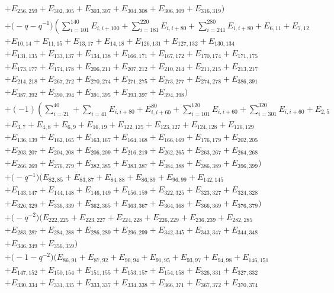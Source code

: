 \documentclass[pdftex]{sigma}
\numberwithin{equation}{section}
\theoremstyle{definition}
\begin{document}
\begin{align*}
&+E_{256,259}+E_{302,305}+E_{303,307}+E_{304,308}+E_{306,309}+E_{316,319})
\\
&+\bigl(-q - q^{-1}\bigr)\left(\sum_{i=101}^{140}E_{i,i+100}+\sum_{i=181}^{220}E_{i,i+80}+ \sum_{i=241}^{280}E_{i,i+80}+E_{6,11}+E_{7,12}\right.\\
&+E_{10,14}+E_{11,15}+E_{13,17}+E_{14,18}+E_{126,131}+E_{127,132}+E_{130,134}\\
&+E_{131,135}+E_{133,137}+E_{134,138}+E_{166,171}+E_{167,172}+E_{170,174}+E_{171,175}\\
&+E_{173,177}+E_{174,178}+E_{206,211}+E_{207,212}+E_{210,214}+E_{211,215}+E_{213,217}\\
&+E_{214,218}+E_{267,272}+E_{270,274}+E_{271,275}+E_{273,277}+E_{274,278}+E_{386,391}\\
&+E_{387,392}+E_{390,394}+E_{391,395}+E_{393,397}+E_{394,398})\\
&
+(-1)\left(\sum_{i=21}^{40} + \sum_{i=41} E_{i,i+80}+E_{i,i+60}^{80}+\sum_{i=101}^{120}E_{i,i+60}+\sum_{i=301}^{320}E_{i,i+60}+E_{2,5}\right. \\
&+E_{3,7}+E_{4,8}+E_{6,9}+E_{16,19}+E_{122,125}+E_{123,127}+E_{124,128}+E_{126,129}\\
&+E_{136,139}+E_{162,165}+E_{163,167}+E_{164,168}+E_{166,169}+E_{176,179}+E_{202,205}\\
&+E_{203,207}+E_{204,208}+E_{206,209}+E_{216,219}+E_{262,265}+E_{263,267}+E_{264,268}\\
&+E_{266,269}+E_{276,279}+E_{382,385}+E_{383,387}+E_{384,388}+E_{386,389}+E_{396,399})
\\
&+\bigl(-q^{-1}\bigr)(E_{82,85}+E_{83,87}+E_{84,88}+E_{86,89}+E_{96,99}+E_{142,145}\\
&+E_{143,147}+E_{144,148}+E_{146,149}+E_{156,159}+E_{322,325}+E_{323,327}+E_{324,328}\\
&+E_{326,329}+E_{336,339}+E_{362,365}+E_{363,367}+E_{364,368}+E_{366,369}+E_{376,379})
\\
&+\bigl(-q^{-2}\bigr)(E_{222,225}+E_{223,227}+E_{224,228}+E_{226,229}+E_{236,239}+E_{282,285}\\
&+E_{283,287}+E_{284,288}+E_{286,289}+E_{296,299}+E_{342,345}+E_{343,347}+E_{344,348}\\
&+E_{346,349}+E_{356,359})\\
&+\bigl(-1 - q^{-2}\bigr)(E_{86,91}+E_{87,92}+E_{90,94}+E_{91,95}+E_{93,97}+E_{94,98}+E_{146,151}\\
&+E_{147,152}+E_{150,154}+E_{151,155}+E_{153,157}+E_{154,158}+E_{326,331}+E_{327,332}\\
&+E_{330,334}+E_{331,335}+E_{333,337}+E_{334,338}+E_{366,371}+E_{367,372}+E_{370,374}\\

\end{align*}
\end{document}

